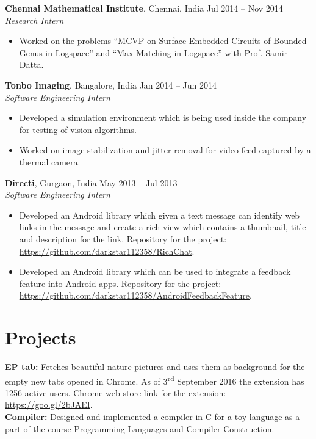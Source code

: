 \documentclass[letterpaper]{article}
\begin{document}
\vspace{-0.5mm}
\textbf{Chennai Mathematical Institute}, Chennai, India \hfill Jul 2014 -- Nov 2014\\
\emph{Research Intern}\\
\vspace{-6mm}
\begin{itemize}
\item Worked on the problems ``MCVP on Surface Embedded Circuits of Bounded Genus in Logspace'' and ``Max Matching in Logspace''
with Prof. Samir Datta.
\end{itemize}

\vspace{-0.5mm}
\textbf{Tonbo Imaging}, Bangalore, India \hfill Jan 2014 -- Jun 2014\\
\emph{Software Engineering Intern}\\
\vspace{-6mm}
\begin{itemize}
\item Developed a simulation environment which is being used inside the company for testing of vision algorithms.
\vspace{-6mm}
\item Worked on image stabilization and jitter removal for video feed captured by a thermal camera.
\end{itemize}

\vspace{-0.5mm}
\textbf{Directi}, Gurgaon, India \hfill May 2013 -- Jul 2013\\
\emph{Software Engineering Intern}\\
\vspace{-6mm}
\begin{itemize}
\item Developed an Android library which given a text message can identify web links in the message and create a rich view
which contains a thumbnail, title and description for the link. Repository for the project: \url{https://github.com/darkstar112358/RichChat}.
\vspace{-2mm}
\item Developed an Android library which can be used to integrate a feedback feature into Android apps. Repository for the project: \url{https://github.com/darkstar112358/AndroidFeedbackFeature}.
\end{itemize}

\section*{Projects}
\textbf{EP tab:}
Fetches beautiful nature pictures and uses them as background for the empty new tabs opened in Chrome.
As of 3\textsuperscript{rd} September 2016 the extension has 1256 active users.
Chrome web store link for the extension: \url{https://goo.gl/2bJAEI}.\\
\textbf{Compiler:}
Designed and implemented a compiler in C for a toy language as a part of the course Programming Languages and Compiler Construction.
\end{document}

